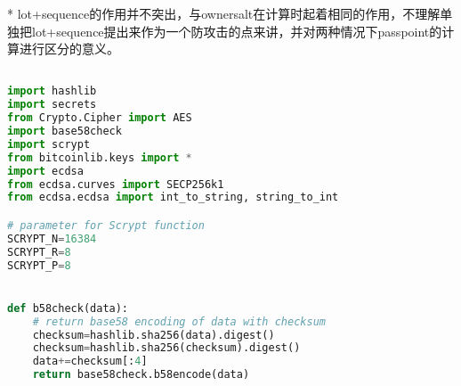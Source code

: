 \documentclass{article}
\begin{document}
* lot+sequence的作用并不突出，与ownersalt在计算时起着相同的作用，不理解单独把lot+sequence提出来作为一个防攻击的点来讲，并对两种情况下passpoint的计算进行区分的意义。

\begin{lstlisting}[language=python, caption = 下面是用python编写的测试代码, label=lst-baddersig]

import hashlib 
import secrets
from Crypto.Cipher import AES
import base58check
import scrypt
from bitcoinlib.keys import *
import ecdsa
from ecdsa.curves import SECP256k1
from ecdsa.ecdsa import int_to_string, string_to_int

# parameter for Scrypt function
SCRYPT_N=16384
SCRYPT_R=8
SCRYPT_P=8


def b58check(data):
	# return base58 encoding of data with checksum
	checksum=hashlib.sha256(data).digest()
	checksum=hashlib.sha256(checksum).digest()
	data+=checksum[:4]
	return base58check.b58encode(data)
\end{lstlisting}
\end{document}
